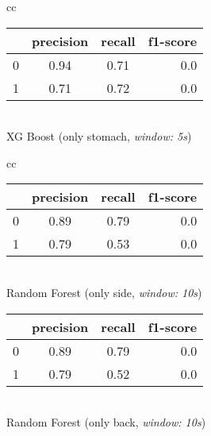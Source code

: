 \begin{table}
\begin{tabular}{cc}
    \begin{minipage}{0.33\textwidth}
        \begin{center}
            \begin{tabular}{ | l | c | c | r | }
              \hline
               & precision & recall & f1-score \\ \hline
              0 & 0.94 & 0.71 & 0.0 \\ \hline
              1 & 0.71 & 0.72 & 0.0 \\
              \hline
            \end{tabular}
            \smallskip 
            \\ XG Boost (only stomach, \textit{window: 5s})
        \end{center}
    \end{minipage}
\end{tabular}
\newline
\vspace*{5mm}
\newline
  \begin{tabular}{cc}    
      \begin{minipage}{.33\linewidth}
          \begin{center}
              \begin{tabular}{ | l | c | c | r | }
                \hline
                 & precision & recall & f1-score \\ \hline
                0 & 0.89 & 0.79 & 0.0 \\ \hline
                1 & 0.79 & 0.53 & 0.0 \\
                \hline
              \end{tabular}
              \smallskip
              \\ Random Forest (only side, \textit{window: 10s})
          \end{center}
      \end{minipage}
  
      \begin{minipage}{.33\linewidth}
          \begin{center}
              \begin{tabular}{ | l | c | c | r | }
                \hline
                 & precision & recall & f1-score \\ \hline
                0 & 0.89 & 0.79 & 0.0 \\ \hline
                1 & 0.79 & 0.52 & 0.0 \\
                \hline
              \end{tabular}
              \smallskip
              \\ Random Forest (only back, \textit{window: 10s})
          \end{center}
      \end{minipage}
 

\end{tabular}
\end{table}

